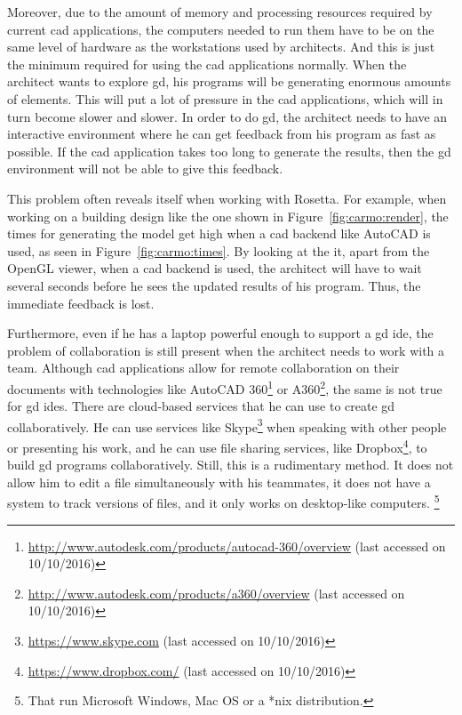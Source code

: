 Moreover, due to the amount of memory and processing resources required by current \gls{cad} applications, the computers needed to run them have to be on the same level of hardware as the workstations used by architects.
And this is just the minimum required for using the \gls{cad} applications normally.
When the architect wants to explore \gls{gd}, his programs will be generating enormous amounts of elements.
This will put a lot of pressure in the \gls{cad} applications, which will in turn become slower and slower.
In order to do \gls{gd}, the architect needs to have an interactive environment where he can get feedback from his program as fast as possible.
If the \gls{cad} application takes too long to generate the results, then the \gls{gd} environment will not be able to give this feedback.

This problem often reveals itself when working with Rosetta.
For example, when working on a building design like the one shown in Figure~\ref{fig:carmo:render}, the times for generating the model get high when a \gls{cad} backend like AutoCAD is used, as seen in Figure~\ref{fig:carmo:times}.
By looking at the it, apart from the OpenGL viewer, when a \gls{cad} backend is used, the architect will have to wait several seconds before he sees the updated results of his program.
Thus, the immediate feedback is lost.

Furthermore, even if he has a laptop powerful enough to support a \gls{gd} \gls{ide}, the problem of collaboration is still present when the architect needs to work with a team.
Although \gls{cad} applications allow for remote collaboration on their documents with technologies like AutoCAD 360\footnote{\url{http://www.autodesk.com/products/autocad-360/overview} (last accessed on 10/10/2016)} or A360\footnote{\url{http://www.autodesk.com/products/a360/overview} (last accessed on 10/10/2016)}, the same is not true for \gls{gd} \glspl{ide}.
There are cloud-based services that he can use to create \gls{gd} collaboratively.
He can use services like Skype\footnote{\url{https://www.skype.com} (last accessed on 10/10/2016)} when speaking with other people or presenting his work, and he can use file sharing services, like Dropbox\footnote{\url{https://www.dropbox.com/} (last accessed on 10/10/2016)}, to build \gls{gd} programs collaboratively.
Still, this is a rudimentary method.
It does not allow him to edit a file simultaneously with his teammates, it does not have a system to track versions of files, and it only works on desktop-like computers.%
\footnote{That run Microsoft Windows, Mac OS or a *nix distribution.}

